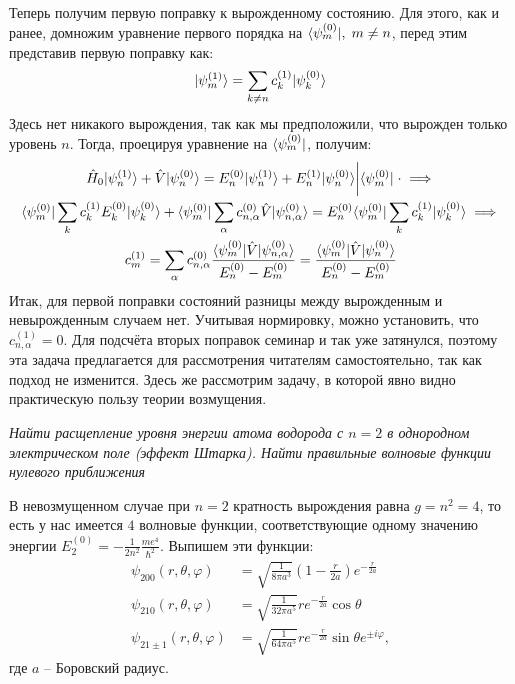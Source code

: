 Теперь получим первую поправку к вырожденному состоянию. Для этого, как и
ранее, домножим уравнение первого порядка на $\langle\psi^{(0)}_{m}\rvert, \; m\neq
  n$, перед этим представив первую поправку как:
\[
  \lvert\psi^{(1)}_{m}\rangle =\sum\limits_{k\neq n}c^{(1)}_{k}\lvert\psi^{(0)}_{k}\rangle
\]
Здесь нет никакого вырождения, так как мы предположили, что вырожден только
уровень $n$. Тогда, проецируя уравнение на $\langle\psi^{(0)}_{m}\rvert$, получим:
\begin{gather*}
  \hat{H}_0\lvert\psi^{(1)}_{n}\rangle + \hat{V}\lvert\psi^{(0)}_{n}\rangle = E^{(0)}_n\lvert\psi^{(1)}_{n}\rangle + E^{(1)}_n\lvert\psi^{(0)}_{n}\rangle \bigg{|} \langle\psi^{(0)}_{m}\rvert\; \cdot \implies\\
  \langle\psi^{(0)}_{m}\rvert\sum\limits_{k}c^{(1)}_kE^{(0)}_k\lvert\psi^{(0)}_{k}\rangle +  \langle\psi^{(0)}_{m}\rvert\sum\limits_{\alpha}c^{(0)}_{n, \alpha}\hat{V} \lvert\psi^{(0)}_{n, \alpha}\rangle = E^{(0)}_n \langle\psi^{(0)}_{m}\rvert\sum\limits_{k}c^{(1)}_k\lvert\psi^{(0)}_{k}\rangle \implies\\
  c^{(1)}_m = \sum\limits_{\alpha}c^{(0)}_{n, \alpha}\frac{\langle\psi^{(0)}_m\rvert \hat{V} \lvert\psi^{(0)}_{n, \alpha}\rangle}{E^{(0)}_{n} - E^{(0)}_m} = \frac{\langle\psi^{(0)}_m\rvert \hat{V} \lvert\psi^{(0)}_{n}\rangle}{E^{(0)}_{n} - E^{(0)}_m}
\end{gather*}
Итак, для первой поправки состояний разницы между вырожденным и невырожденным
случаем нет. Учитывая нормировку, можно установить, что $c^{(1)}_{n, \alpha} =
  0$. Для подсчёта вторых поправок семинар и так уже затянулся, поэтому эта
задача предлагается для рассмотрения читателям самостоятельно, так как подход
не изменится. Здесь же рассмотрим задачу, в которой явно видно практическую
пользу теории возмущения.

\begin{exercise}
  \textit{Найти расщепление уровня энергии атома водорода с $n = 2$ в однородном
    электрическом поле (эффект Штарка). Найти правильные волновые функции нулевого
    приближения}
\end{exercise}
В невозмущенном случае при $n=2$ кратность вырождения равна $g=n^2=4$, то есть
у нас имеется $4$ волновые функции, соответствующие одному значению энергии
$E_2^{(0)} = -\frac{1}{2n^2}\frac{me^4}{\hbar^2}$. Выпишем эти функции:
\begin{align*}
  \psi_{200}(r,\theta,\varphi)&=\sqrt{\frac{1}{8\pi a^3}}\left(1-\frac{r}{2a}\right)e^{-\frac{r}{2a}}\\
  \psi_{210}(r,\theta,\varphi)&=\sqrt{\frac{1}{32\pi a^5}}re^{-\frac{r}{2a}}\cos\theta \\
  \psi_{21\pm1}(r,\theta,\varphi)&=\sqrt{\frac{1}{64\pi a^5}}re^{-\frac{r}{2a}}\sin\theta e^{\pm i\varphi},
\end{align*}
где $a$ -- Боровский радиус.

